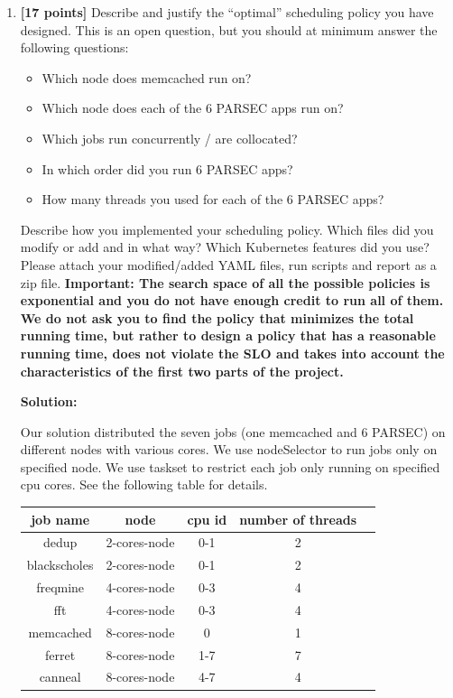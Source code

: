 \documentclass[11pt]{article}
\begin{document}
\begin{enumerate}
    \item \textbf{[17 points]} Describe and justify the “optimal” scheduling policy you have designed. This is an open question, but you should at minimum answer the following questions: 
    \begin{itemize}
        \item	Which node does memcached run on?
        \item	Which node does each of the 6 PARSEC apps run on? 
        \item	Which jobs run concurrently / are collocated?
        \item	In which order did you run 6 PARSEC apps?
        \item	How many threads you used for each of the 6 PARSEC apps? 
    \end{itemize}
    Describe how you implemented your scheduling policy. Which files did you modify or add and in what way? Which Kubernetes features did you use? Please attach your modified/added YAML files, run scripts and report as a zip file.
    \textbf{Important: The search space of all the possible policies is exponential and you do not have enough credit to run all of them. We do not ask you to find the policy that minimizes
    the total running time, but rather to design a policy that has a reasonable running time, does not violate the SLO and takes into account the characteristics of the first two parts of the project.}
    
    \textbf{Solution:}
    
    
    Our solution distributed the seven jobs (one memcached and 6 PARSEC) on different nodes with various cores. We use nodeSelector to run jobs only on specified node. We use taskset to restrict each job only running on specified cpu cores. See the following table for details.

\begin{table}[h]
\centering
\begin{tabular}{ |c|c|c|c|c|} 
\hline
job name & node & cpu id & number of threads \\ \hline \hline
dedup         & 2-cores-node & 0-1 & 2\\  \hline
blackscholes  & 2-cores-node & 0-1 & 2\\  \hline
freqmine      & 4-cores-node & 0-3 & 4\\  \hline
fft           & 4-cores-node & 0-3 & 4\\  \hline
memcached     & 8-cores-node & 0   & 1\\  \hline
ferret        & 8-cores-node & 1-7 & 7\\  \hline
canneal       & 8-cores-node & 4-7 & 4\\  \hline
\end{tabular}
\end{table}


\end{enumerate}
\end{document}
